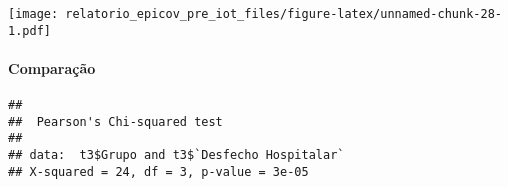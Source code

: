 \documentclass[
]{article}
\newenvironment{Shaded}{\begin{snugshade}}{\end{snugshade}}
\newcommand{\AttributeTok}[1]{\textcolor[rgb]{0.77,0.63,0.00}{#1}}
\newcommand{\FunctionTok}[1]{\textcolor[rgb]{0.00,0.00,0.00}{#1}}
\newcommand{\NormalTok}[1]{#1}
\newcommand{\OtherTok}[1]{\textcolor[rgb]{0.56,0.35,0.01}{#1}}
\newcommand{\SpecialCharTok}[1]{\textcolor[rgb]{0.00,0.00,0.00}{#1}}
\newcommand{\StringTok}[1]{\textcolor[rgb]{0.31,0.60,0.02}{#1}}
\begin{document}
\texttt{[image: relatorio\_epicov\_pre\_iot\_files/figure-latex/unnamed-chunk-28-1.pdf]}

\hypertarget{comparauxe7uxe3o-1}{%
\paragraph{\texorpdfstring{\textbf{Comparação}}{Comparação}}\label{comparauxe7uxe3o-1}}

\begin{Shaded}
\end{Shaded}

\begin{verbatim}
## 
##  Pearson's Chi-squared test
## 
## data:  t3$Grupo and t3$`Desfecho Hospitalar`
## X-squared = 24, df = 3, p-value = 3e-05
\end{verbatim}
\end{document}
